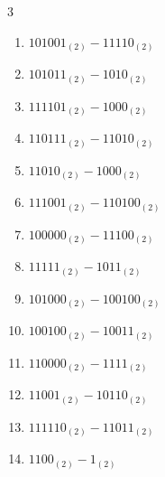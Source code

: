 \begin{multicols}{3}
\begin{enumerate}
  \item $101001_{(2)} - 11110_{(2)}$


  \item $101011_{(2)} - 1010_{(2)}$


  \item $111101_{(2)} - 1000_{(2)}$


  \item $110111_{(2)} - 11010_{(2)}$


\columnbreak %

\resetques

  \item $11010_{(2)} - 1000_{(2)}$


  \item $111001_{(2)} - 110100_{(2)}$


  \item $100000_{(2)} - 11100_{(2)}$


  \item $11111_{(2)} - 1011_{(2)}$


  \item $101000_{(2)} - 100100_{(2)}$


  \item $100100_{(2)} - 10011_{(2)}$


  \item $110000_{(2)} - 1111_{(2)}$


  \item $11001_{(2)} - 10110_{(2)}$


  \item $111110_{(2)} - 11011_{(2)}$


  \item $1100_{(2)} - 1_{(2)}$


\end{enumerate}
\end{multicols}
